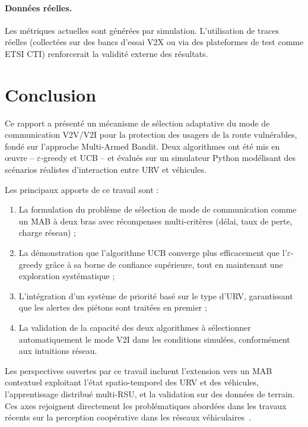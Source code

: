 \documentclass[12pt,a4paper]{article}
\begin{document}
\paragraph{Données réelles.}
Les métriques actuelles sont générées par simulation. L'utilisation de traces
réelles (collectées sur des bancs d'essai V2X ou via des plateformes de test comme
ETSI CTI) renforcerait la validité externe des résultats.

\section{Conclusion}
\label{sec:conclusion}

Ce rapport a présenté un mécanisme de sélection adaptative du mode de communication
V2V/V2I pour la protection des usagers de la route vulnérables, fondé sur l'approche
Multi-Armed Bandit. Deux algorithmes ont été mis en œuvre -- $\varepsilon$-greedy
et UCB -- et évalués sur un simulateur Python modélisant des scénarios réalistes
d'interaction entre URV et véhicules.

Les principaux apports de ce travail sont :
\begin{enumerate}[leftmargin=*]
  \item La formulation du problème de sélection de mode de communication comme
        un MAB à deux bras avec récompenses multi-critères (délai, taux de perte,
        charge réseau) ;
  \item La démonstration que l'algorithme UCB converge plus efficacement que
        l'$\varepsilon$-greedy grâce à sa borne de confiance supérieure, tout en
        maintenant une exploration systématique ;
  \item L'intégration d'un système de priorité basé sur le type d'URV, garantissant
        que les alertes des piétons sont traitées en premier ;
  \item La validation de la capacité des deux algorithmes à sélectionner automatiquement
        le mode V2I dans les conditions simulées, conformément aux intuitions réseau.
\end{enumerate}

Les perspectives ouvertes par ce travail incluent l'extension vers un MAB contextuel
exploitant l'état spatio-temporel des URV et des véhicules, l'apprentissage distribué
multi-RSU, et la validation sur des données de terrain. Ces axes rejoignent directement
les problématiques abordées dans les travaux récents sur la perception coopérative
dans les réseaux véhiculaires~\cite{bouriga2026}.
\end{document}
